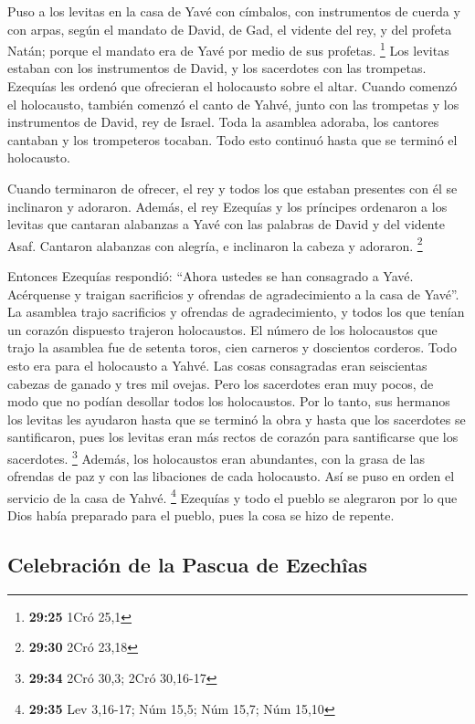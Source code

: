  Puso a los levitas en la casa de Yavé con címbalos, con
instrumentos de cuerda y con arpas, según el mandato de David, de Gad,
el vidente del rey, y del profeta Natán; porque el mandato era de Yavé
por medio de sus profetas. \footnote{\textbf{29:25} 1Cró 25,1}
 Los levitas estaban con los instrumentos de David, y los
sacerdotes con las trompetas.  Ezequías les ordenó que
ofrecieran el holocausto sobre el altar. Cuando comenzó el holocausto,
también comenzó el canto de Yahvé, junto con las trompetas y los
instrumentos de David, rey de Israel.  Toda la asamblea
adoraba, los cantores cantaban y los trompeteros tocaban. Todo esto
continuó hasta que se terminó el holocausto.

 Cuando terminaron de ofrecer, el rey y todos los que
estaban presentes con él se inclinaron y adoraron. 
Además, el rey Ezequías y los príncipes ordenaron a los levitas que
cantaran alabanzas a Yavé con las palabras de David y del vidente Asaf.
Cantaron alabanzas con alegría, e inclinaron la cabeza y adoraron.
\footnote{\textbf{29:30} 2Cró 23,18}

 Entonces Ezequías respondió: ``Ahora ustedes se han
consagrado a Yavé. Acérquense y traigan sacrificios y ofrendas de
agradecimiento a la casa de Yavé''. La asamblea trajo sacrificios y
ofrendas de agradecimiento, y todos los que tenían un corazón dispuesto
trajeron holocaustos.  El número de los holocaustos que
trajo la asamblea fue de setenta toros, cien carneros y doscientos
corderos. Todo esto era para el holocausto a Yahvé.  Las
cosas consagradas eran seiscientas cabezas de ganado y tres mil ovejas.
 Pero los sacerdotes eran muy pocos, de modo que no
podían desollar todos los holocaustos. Por lo tanto, sus hermanos los
levitas les ayudaron hasta que se terminó la obra y hasta que los
sacerdotes se santificaron, pues los levitas eran más rectos de corazón
para santificarse que los sacerdotes. \footnote{\textbf{29:34} 2Cró
  30,3; 2Cró 30,16-17}  Además, los holocaustos eran
abundantes, con la grasa de las ofrendas de paz y con las libaciones de
cada holocausto. Así se puso en orden el servicio de la casa de Yahvé.
\footnote{\textbf{29:35} Lev 3,16-17; Núm 15,5; Núm 15,7; Núm 15,10}
 Ezequías y todo el pueblo se alegraron por lo que Dios
había preparado para el pueblo, pues la cosa se hizo de repente.

\hypertarget{celebraciuxf3n-de-la-pascua-de-ezechuxeeas}{%
\subsection{Celebración de la Pascua de
Ezechîas}\label{celebraciuxf3n-de-la-pascua-de-ezechuxeeas}}

